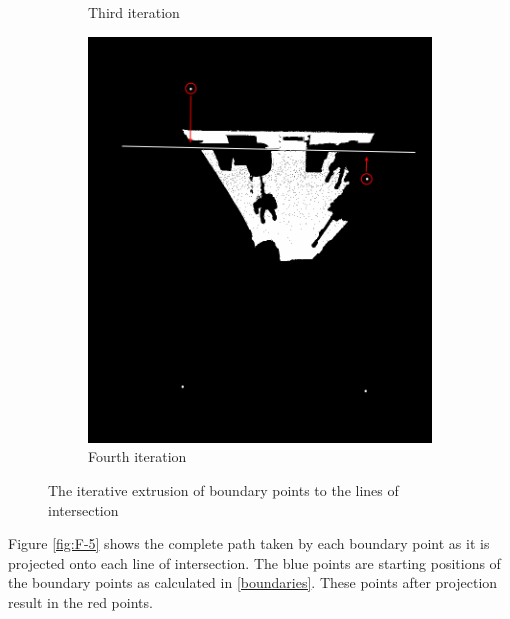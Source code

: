 \begin{figure}[p]
\begin{subfigure}[b]{0.49\linewidth}
					\caption{Third iteration} 
					\label{fig4Adjust:c} 
				\end{subfigure}
				\begin{subfigure}[b]{0.49\linewidth}
					\centering
					\includegraphics[width=1\linewidth]{"Includes/images/Project Points/F-4"} 
					\caption{Fourth iteration} 
					\label{fig4Adjust:d} 
				\end{subfigure} 
				\caption{The iterative extrusion of boundary points to the lines of intersection}
				\label{fig:4Adjust} 
			\end{figure}
			
			Figure \ref{fig:F-5} shows the complete path taken by each boundary point as it is projected onto each line of intersection. The blue points are starting positions of the boundary points as calculated in \ref{boundaries}. These points after projection result in the red points.

